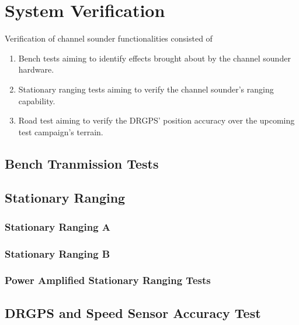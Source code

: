 \chapter{System Verification}\label{sec:Verification}\label{sec:verify}
Verification of channel sounder functionalities consisted of
\begin{enumerate}
   \item Bench tests aiming to identify effects brought about by the channel sounder hardware.
   \item Stationary ranging tests aiming to verify the channel sounder's ranging capability. 
   \item Road test aiming to verify the DRGPS' position accuracy over the upcoming test campaign's terrain.
\end{enumerate}

\section{Bench Tranmission Tests}\label{sec:Verification_BenchTests}

\section{Stationary Ranging}

\subsection{Stationary Ranging A}

\subsection{Stationary Ranging B}

\subsection{Power Amplified Stationary Ranging Tests}

\section{DRGPS and Speed Sensor Accuracy Test}